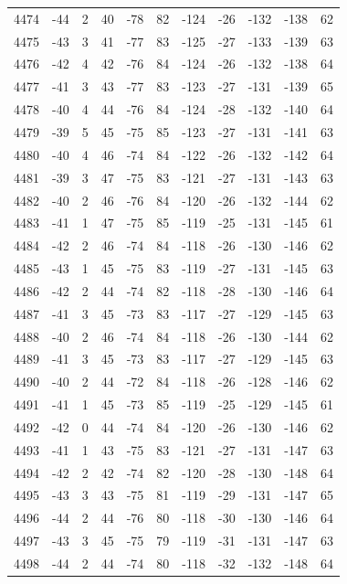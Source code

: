 \begin{table}[H]
\begin{tabular}{lllllllllll}
4474 & -44 & 2 & 40 & -78 & 82 & -124 & -26 & -132 & -138 & 62 \\
4475 & -43 & 3 & 41 & -77 & 83 & -125 & -27 & -133 & -139 & 63 \\
4476 & -42 & 4 & 42 & -76 & 84 & -124 & -26 & -132 & -138 & 64 \\
4477 & -41 & 3 & 43 & -77 & 83 & -123 & -27 & -131 & -139 & 65 \\
4478 & -40 & 4 & 44 & -76 & 84 & -124 & -28 & -132 & -140 & 64 \\
4479 & -39 & 5 & 45 & -75 & 85 & -123 & -27 & -131 & -141 & 63 \\
4480 & -40 & 4 & 46 & -74 & 84 & -122 & -26 & -132 & -142 & 64 \\
4481 & -39 & 3 & 47 & -75 & 83 & -121 & -27 & -131 & -143 & 63 \\
4482 & -40 & 2 & 46 & -76 & 84 & -120 & -26 & -132 & -144 & 62 \\
4483 & -41 & 1 & 47 & -75 & 85 & -119 & -25 & -131 & -145 & 61 \\
4484 & -42 & 2 & 46 & -74 & 84 & -118 & -26 & -130 & -146 & 62 \\
4485 & -43 & 1 & 45 & -75 & 83 & -119 & -27 & -131 & -145 & 63 \\
4486 & -42 & 2 & 44 & -74 & 82 & -118 & -28 & -130 & -146 & 64 \\
4487 & -41 & 3 & 45 & -73 & 83 & -117 & -27 & -129 & -145 & 63 \\
4488 & -40 & 2 & 46 & -74 & 84 & -118 & -26 & -130 & -144 & 62 \\
4489 & -41 & 3 & 45 & -73 & 83 & -117 & -27 & -129 & -145 & 63 \\
4490 & -40 & 2 & 44 & -72 & 84 & -118 & -26 & -128 & -146 & 62 \\
4491 & -41 & 1 & 45 & -73 & 85 & -119 & -25 & -129 & -145 & 61 \\
4492 & -42 & 0 & 44 & -74 & 84 & -120 & -26 & -130 & -146 & 62 \\
4493 & -41 & 1 & 43 & -75 & 83 & -121 & -27 & -131 & -147 & 63 \\
4494 & -42 & 2 & 42 & -74 & 82 & -120 & -28 & -130 & -148 & 64 \\
4495 & -43 & 3 & 43 & -75 & 81 & -119 & -29 & -131 & -147 & 65 \\
4496 & -44 & 2 & 44 & -76 & 80 & -118 & -30 & -130 & -146 & 64 \\
4497 & -43 & 3 & 45 & -75 & 79 & -119 & -31 & -131 & -147 & 63 \\
4498 & -44 & 2 & 44 & -74 & 80 & -118 & -32 & -132 & -148 & 64 \\

\end{tabular}
\end{table}
